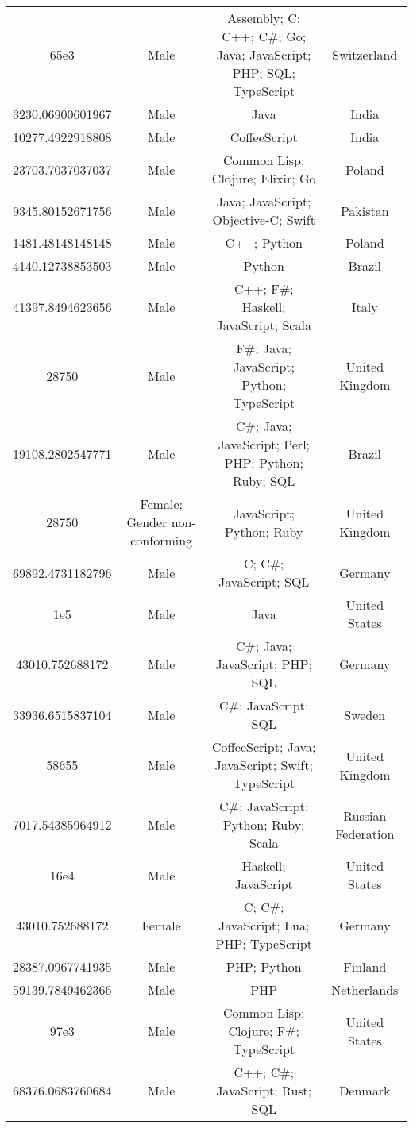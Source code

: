 \begin{center}
\begin{tabular}{ |c|c|c|c| }
65e3  &  Male  &  Assembly; C; C++; C\#; Go; Java; JavaScript; PHP; SQL; TypeScript  &  Switzerland  \\ 
3230.06900601967  &  Male  &  Java  &  India  \\ 
10277.4922918808  &  Male  &  CoffeeScript  &  India  \\ 
23703.7037037037  &  Male  &  Common Lisp; Clojure; Elixir; Go  &  Poland  \\ 
9345.80152671756  &  Male  &  Java; JavaScript; Objective-C; Swift  &  Pakistan  \\ 
1481.48148148148  &  Male  &  C++; Python  &  Poland  \\ 
4140.12738853503  &  Male  &  Python  &  Brazil  \\ 
41397.8494623656  &  Male  &  C++; F\#; Haskell; JavaScript; Scala  &  Italy  \\ 
28750  &  Male  &  F\#; Java; JavaScript; Python; TypeScript  &  United Kingdom  \\ 
19108.2802547771  &  Male  &  C\#; Java; JavaScript; Perl; PHP; Python; Ruby; SQL  &  Brazil  \\ 
28750  &  Female; Gender non-conforming  &  JavaScript; Python; Ruby  &  United Kingdom  \\ 
69892.4731182796  &  Male  &  C; C\#; JavaScript; SQL  &  Germany  \\ 
1e5  &  Male  &  Java  &  United States  \\ 
43010.752688172  &  Male  &  C\#; Java; JavaScript; PHP; SQL  &  Germany  \\ 
33936.6515837104  &  Male  &  C\#; JavaScript; SQL  &  Sweden  \\ 
58655  &  Male  &  CoffeeScript; Java; JavaScript; Swift; TypeScript  &  United Kingdom  \\ 
7017.54385964912  &  Male  &  C\#; JavaScript; Python; Ruby; Scala  &  Russian Federation  \\ 
16e4  &  Male  &  Haskell; JavaScript  &  United States  \\ 
43010.752688172  &  Female  &  C; C\#; JavaScript; Lua; PHP; TypeScript  &  Germany  \\ 
28387.0967741935  &  Male  &  PHP; Python  &  Finland  \\ 
59139.7849462366  &  Male  &  PHP  &  Netherlands  \\ 
97e3  &  Male  &  Common Lisp; Clojure; F\#; TypeScript  &  United States  \\ 
68376.0683760684  &  Male  &  C++; C\#; JavaScript; Rust; SQL  &  Denmark  \\ 

\end{tabular}
\end{center}

